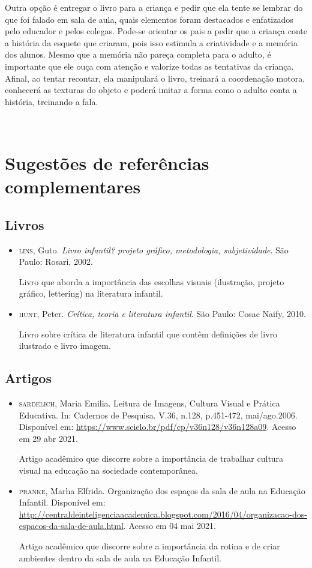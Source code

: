 \documentclass[11pt]{extarticle}
\begin{document}
\begin{enumerate}
Outra opção é entregar o livro para a criança e pedir que ela tente se lembrar
do que foi falado em sala de aula, quais elementos foram destacados e enfatizados pelo educador e pelos colegas. Pode-se orientar os pais a pedir que a criança conte a história da esquete que criaram, pois isso estimula a criatividade e a memória dos alunos. Mesmo que a memória não pareça 
completa para o adulto, é importante que ele ouça com atenção e 
valorize todas as tentativas da criança. Afinal, ao tentar recontar, 
ela manipulará o livro, treinará a coordenação motora, conhecerá as texturas 
do objeto e poderá imitar a forma como o adulto 
conta a história, treinando a fala. 
\end{enumerate}

 
\section{Sugestões de referências complementares}

\subsection{Livros} 

\begin{itemize}
\item \textsc{lins}, Guto. \textit{Livro infantil? projeto gráfico, metodologia, subjetividade}. São Paulo: Rosari, 2002.

Livro que aborda a importância das escolhas visuais (ilustração, projeto gráfico, lettering) na literatura infantil.  

\item \textsc{hunt}, Peter. \textit{Crítica, teoria e literatura infantil}. São Paulo: Cosac Naify, 2010.

Livro sobre crítica de literatura infantil que contêm definições de livro ilustrado e livro imagem. 
\end{itemize}

\subsection{Artigos}

\begin{itemize}
\item \textsc{sardelich}, Maria Emilia. Leitura de Imagens, Cultura Visual e Prática Educativa. 
In: Cadernos de Pesquisa. V.36, n.128, p.451-472, mai/ago.2006. Disponível em: \url{https://www.scielo.br/pdf/cp/v36n128/v36n128a09}. 
Acesso em 29 abr 2021. 

Artigo acadêmico que discorre sobre a importância de trabalhar cultura 
visual na educação na sociedade contemporânea. 

\item \textsc{pranke}, Marha Elfrida. Organização dos espaços da sala de aula na Educação Infantil. Disponível em: \url{http://centraldeinteligenciaacademica.blogspot.com/2016/04/organizacao-dos-espacos-da-sala-de-aula.html}. Acesso em 04 mai 2021. 

Artigo acadêmico que discorre sobre a importância da rotina e de criar ambientes dentro da sala de aula na Educação Infantil.  
\end{itemize}
\end{document}
